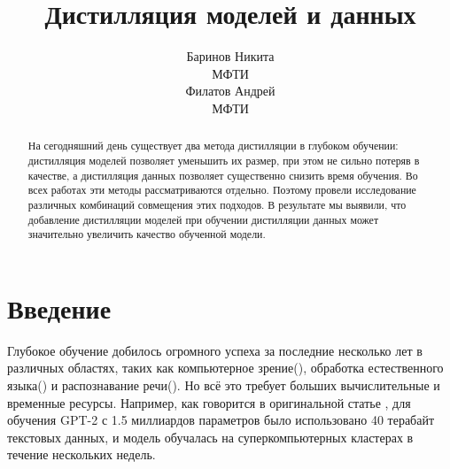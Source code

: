 \documentclass[12pt]{article}
\title{Дистилляция моделей и данных}
\author{ Баринов Никита\\
	МФТИ\\
	\And
	Филатов Андрей \\
	МФТИ       
}
\date{}
\begin{document}
\maketitle

\begin{abstract}



На сегодняшний день существует два метода дистилляции в глубоком обучении: дистилляция моделей позволяет уменьшить их размер, при этом не сильно потеряв в качестве, а дистилляция данных позволяет существенно снизить время обучения. Во всех работах эти методы рассматриваются отдельно. Поэтому провели исследование  различных комбинаций совмещения этих подходов. В результате мы выявили, что добавление дистилляции моделей при обучении дистилляции данных может значительно увеличить качество обученной модели.




\end{abstract}



\section{Введение}

Глубокое обучение добилось огромного успеха за последние несколько лет в различных областях, таких как компьютерное зрение(\cite{guo2022attention}), обработка естественного языка(\cite{raina2022natural}) и распознавание речи(\cite{subramanian2022deep}). Но всё это требует больших вычислительные и временные ресурсы. Например, как говорится в оригинальной статье \cite{radford2019language}, для обучения GPT-2 с 1.5 миллиардов параметров было использовано 40 терабайт текстовых данных, и модель обучалась на суперкомпьютерных кластерах в течение нескольких недель.
\end{document}
